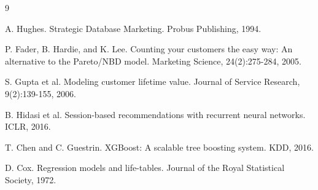 \documentclass[11pt,a4paper]{article}
\begin{document}

\begin{thebibliography}{9}

A. Hughes. Strategic Database Marketing. Probus Publishing, 1994.

P. Fader, B. Hardie, and K. Lee. Counting your customers the easy way: An alternative to the Pareto/NBD model. Marketing Science, 24(2):275-284, 2005.

S. Gupta et al. Modeling customer lifetime value. Journal of Service Research, 9(2):139-155, 2006.

B. Hidasi et al. Session-based recommendations with recurrent neural networks. ICLR, 2016.

T. Chen and C. Guestrin. XGBoost: A scalable tree boosting system. KDD, 2016.

D. Cox. Regression models and life-tables. Journal of the Royal Statistical Society, 1972.

\end{thebibliography}
\end{document}
